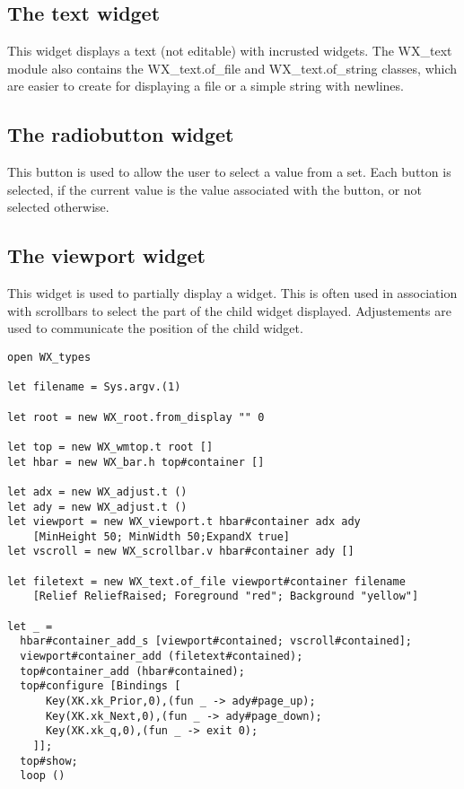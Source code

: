 \documentclass{report}
\begin{document}
\subsection{The {\sf text} widget}

 This widget displays a text (not editable) with incrusted widgets. The {\sf
WX\_text} module also contains the {\sf WX\_text.of\_file} and {\sf
WX\_text.of\_string} classes, which are easier to create for displaying a 
file or a simple string with newlines.

\subsection{The {\sf radiobutton} widget}

 This button is used to allow the user to select a value from a set.
Each button is selected, if the current value is the value associated with 
the button, or not selected otherwise.

\subsection{The {\sf viewport} widget}
\label{viewport}

 This widget is used to partially display a widget. This is often used in 
association with scrollbars to select the part of the child widget 
displayed. Adjustements are used to communicate the position of the child 
widget. 

\begin{verbatim}
open WX_types

let filename = Sys.argv.(1)
  
let root = new WX_root.from_display "" 0

let top = new WX_wmtop.t root []
let hbar = new WX_bar.h top#container []

let adx = new WX_adjust.t ()
let ady = new WX_adjust.t ()
let viewport = new WX_viewport.t hbar#container adx ady 
    [MinHeight 50; MinWidth 50;ExpandX true]
let vscroll = new WX_scrollbar.v hbar#container ady []

let filetext = new WX_text.of_file viewport#container filename
    [Relief ReliefRaised; Foreground "red"; Background "yellow"]
  
let _ =
  hbar#container_add_s [viewport#contained; vscroll#contained];
  viewport#container_add (filetext#contained);
  top#container_add (hbar#contained);  
  top#configure [Bindings [
      Key(XK.xk_Prior,0),(fun _ -> ady#page_up);
      Key(XK.xk_Next,0),(fun _ -> ady#page_down);
      Key(XK.xk_q,0),(fun _ -> exit 0);
    ]];
  top#show;
  loop ()
\end{verbatim}
\end{document}
